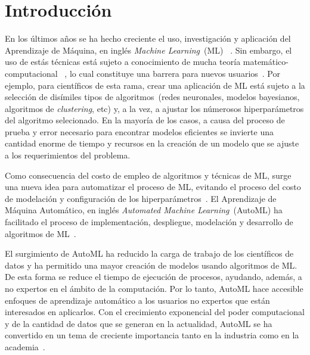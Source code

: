 \chapter*{Introducción}\label{chapter:introduction}

En los últimos años se ha hecho creciente el uso, investigación y aplicación
del Aprendizaje de Máquina, en inglés \emph{Machine Learning}~(ML)
~. Sin embargo, el uso de estás técnicas está
sujeto a conocimiento de mucha teoría matemático-computacional
~, lo cual constituye una barrera para nuevos
usuarios~. Por ejemplo, para científicos de esta
rama, crear una aplicación de ML está sujeto a la selección de disímiles tipos
de algoritmos~(redes neuronales, modelos bayesianos, algoritmos de
\emph{clustering}, etc) y, a la vez, a ajustar los númerosos hiperparámetros
del algoritmo selecionado. En la mayoría de los casos, a causa del proceso de
prueba y error necesario para encontrar modelos eficientes se invierte una
cantidad enorme de tiempo y recursos en la creación de un modelo que se ajuste
a los requerimientos del problema.

Como consecuencia del costo de empleo de algoritmos y técnicas de ML, surge una
nueva idea para automatizar el proceso de ML, evitando el proceso del costo de
modelación y configuración de los hiperparámetros~.
El Aprendizaje de Máquina Automático, en inglés \emph{Automated Machine
Learning}~(AutoML) ha facilitado el proceso de implementación, despliegue,
modelación y desarrollo de algoritmos de ML~.

El surgimiento de AutoML ha reducido la carga de trabajo de los científicos de
datos y ha permitido una mayor creación de modelos usando algoritmos de ML. De
esta forma se reduce el tiempo de ejecución de procesos, ayudando, además, a no
expertos en el ámbito de la computación. Por lo tanto, AutoML hace accesible
enfoques de aprendizaje automático a los usuarios no expertos que están
interesados en aplicarlos. Con el crecimiento exponencial del poder
computacional y de la cantidad de datos que se generan en la actualidad,
AutoML se ha convertido en un tema de creciente importancia tanto en la
industria como en la academia~.

